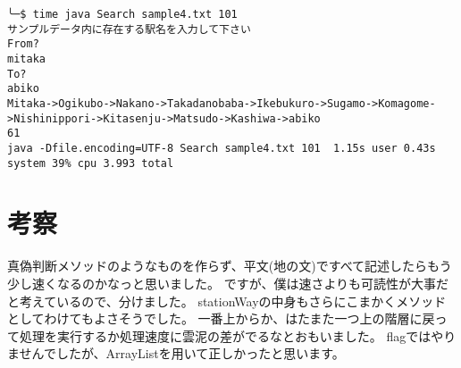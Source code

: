 \documentclass[titlepage]{jarticle}
\begin{document}
\begin{verbatim}
╰─$ time java Search sample4.txt 101
サンプルデータ内に存在する駅名を入力して下さい
From?
mitaka
To?
abiko
Mitaka->Ogikubo->Nakano->Takadanobaba->Ikebukuro->Sugamo->Komagome->Nishinippori->Kitasenju->Matsudo->Kashiwa->abiko
61
java -Dfile.encoding=UTF-8 Search sample4.txt 101  1.15s user 0.43s system 39% cpu 3.993 total
\end{verbatim}

\section{考察}
真偽判断メソッドのようなものを作らず、平文(地の文)ですべて記述したらもう少し速くなるのかなっと思いました。
ですが、僕は速さよりも可読性が大事だと考えているので、分けました。
stationWayの中身もさらにこまかくメソッドとしてわけてもよさそうでした。
一番上からか、はたまた一つ上の階層に戻って処理を実行するか処理速度に雲泥の差がでるなとおもいました。
flagではやりませんでしたが、ArrayListを用いて正しかったと思います。
\end{document}
